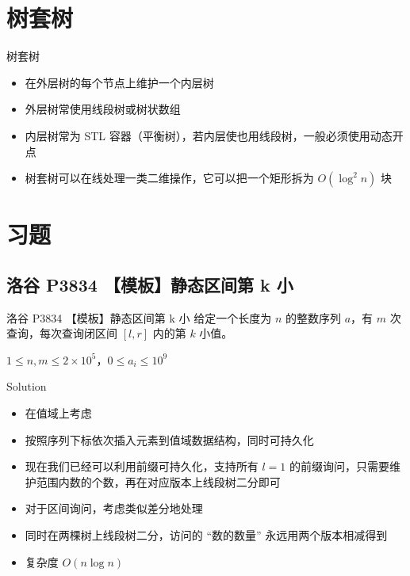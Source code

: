 ﻿\documentclass[aspectratio=169]{ctexbeamer}
\begin{document}
\section{树套树}

\begin{frame}{树套树}
    \begin{itemize}
        \item 在外层树的每个节点上维护一个内层树
        \item 外层树常使用线段树或树状数组
        \item 内层树常为 STL 容器（平衡树），若内层使也用线段树，一般必须使用动态开点
        \item 树套树可以在线处理一类二维操作，它可以把一个矩形拆为 $O(\log^2 n)$ 块
    \end{itemize}
\end{frame}
















\section{习题}

\subsection{洛谷 P3834 【模板】静态区间第 k 小}

\begin{frame}{洛谷 P3834 【模板】静态区间第 k 小}
    给定一个长度为 $n$ 的整数序列 $a$，有 $m$ 次查询，每次查询闭区间 $[l,r]$ 内的第 $k$ 小值。
    
    $1\le n,m\le 2\times10^5$，$0\le a_i\le 10^9$
\end{frame}

\begin{frame}{Solution}
    \begin{itemize}
        \item 在值域上考虑
        \item 按照序列下标依次插入元素到值域数据结构，同时可持久化
        \item 现在我们已经可以利用前缀可持久化，支持所有 $l=1$ 的前缀询问，只需要维护范围内数的个数，再在对应版本上线段树二分即可
        \item 对于区间询问，考虑类似差分地处理
        \item 同时在两棵树上线段树二分，访问的 “数的数量” 永远用两个版本相减得到
        \item 复杂度 $O(n\log n)$
    \end{itemize}
\end{frame}
\end{document}

